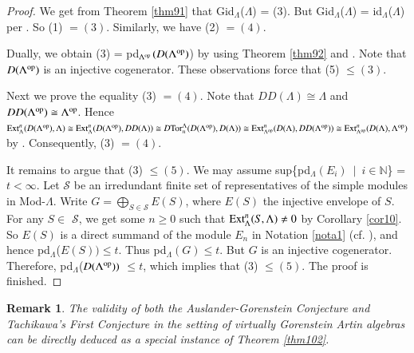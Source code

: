 \documentclass[11pt,a4paper]{article}
\newtheorem{rem}[thm]{Remark}
\begin{document}
 \begin{proof} We get from Theorem \ref{thm91} that {\rm Gid$_{\Lambda}$($\Lambda$)} =   (3).
 But {\rm Gid$_{\Lambda}$($\Lambda$)} = {\rm id$_{\Lambda}$($\Lambda$)} per \cite[Theorem  2.1]{hol1}. So (1) $= (3)$.
Similarly, we have (2) $= (4)$.

Dually, we obtain (3) =   pd$_{\Lambda^{{\rm op}}}$$(D(\Lambda^{{\rm op}})$) by using Theorem \ref{thm92} and  \cite[Theorem  2.2]{hol1}.
 Note that $D(\Lambda^{{\rm op}})$ is an injective cogenerator. These observations force that (5) $\leq (3)$.


 Next we prove the equality (3) $= (4)$. Note that $DD(\Lambda) \cong \Lambda$  and $DD(\Lambda^{{\rm op}}) \cong \Lambda^{{\rm op}}$. Hence
${\rm Ext}_{\Lambda}^{n}(D(\Lambda^{{\rm op}}), \Lambda) \cong {\rm Ext}_{\Lambda}^{n}(D(\Lambda^{{\rm op}}), DD(\Lambda)) \cong
 D{\rm Tor}_{n}^{\Lambda}(D(\Lambda^{{\rm op}}), D(\Lambda))
 \cong      {\rm Ext}_{\Lambda^{{\rm op}}}^{n}(D(\Lambda), DD(\Lambda^{{\rm op}})) \cong      {\rm Ext}_{\Lambda^{{\rm op}}}^{n}(D(\Lambda), \Lambda^{{\rm op}})$
by  \cite[ Lemma 2.16(b)]{gbe}. Consequently, (3) $= (4)$.

 It remains to argue that (3) $\leq (5)$.  We may assume {\rm sup\{pd$_{\Lambda}$$(E_{i})$\ $|$\ $i \in \mathbb{N}$\}} = $t < \infty$.
  Let    $\mathscr{S}$  be an irredundant finite set of representatives of the simple modules in Mod-$\Lambda$.
Write $G = \bigoplus_{S\in \mathscr{S} } E(S)$, where $E(S)$ the injective envelope of    $S$.
 For any  $S\in$ $\mathscr{S}$,  we get some  $n \geq 0$ such that  ${\rm Ext}_{\Lambda}^{n}(S, \Lambda)\neq 0$
by Corollary \ref{cor10}.
 So $E(S)$ is a direct summand of the module $E_{n}$ in Notation \ref{nota1} (cf. \cite[p. 70]{ar0}), and hence {\rm pd}$_{\Lambda}$($E(S)) \leq  t$.
 Thus   pd$_{\Lambda}$$(G) \leq t$. But  $G $ is an injective cogenerator. Therefore,
  {\rm pd}$_{\Lambda}$($D(\Lambda^{{\rm op}}))$  $\leq t$, which implies   that (3) $\leq (5)$. The proof is finished.
 \end{proof}


\begin{rem}\label{rem30}  {\rm
The validity of both the Auslander-Gorenstein Conjecture and Tachikawa's First Conjecture in the setting of virtually Gorenstein Artin algebras
can be directly deduced as a special instance of Theorem \ref{thm102}.}\end{rem}
\end{document}
